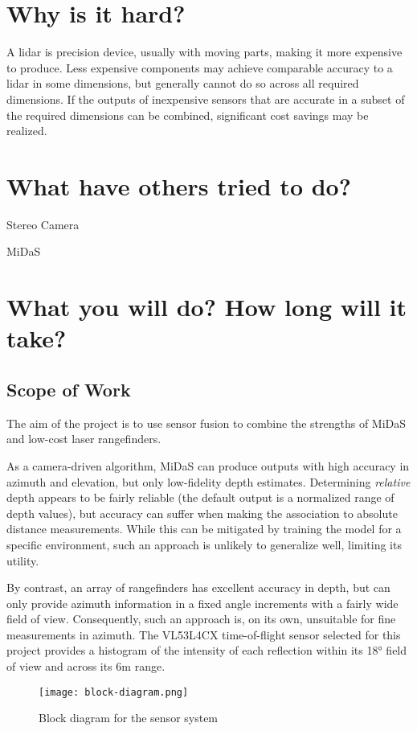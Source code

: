 \documentclass[conference]{IEEEtran}
\begin{document}
\section{Why is it hard?}
A lidar is precision device, usually with moving parts, making it more
expensive to produce. Less expensive components may achieve comparable accuracy
to a lidar in some dimensions, but generally cannot do so across all required
dimensions. If the outputs of inexpensive sensors that are accurate in a subset
of the required dimensions can be combined, significant cost savings may be
realized.

\section{What have others tried to do?}
Stereo Camera

MiDaS \cite{midas}


\section{What you will do? How long will it take?}
\subsection{Scope of Work}
The aim of the project is to use sensor fusion to combine the strengths of
MiDaS and low-cost laser rangefinders.

As a camera-driven algorithm, MiDaS can produce outputs with high accuracy in
azimuth and elevation, but only low-fidelity depth estimates. Determining
\textit{relative} depth appears to be fairly reliable (the default output is a
normalized range of depth values), but accuracy can suffer when making the
association to absolute distance measurements. While this can be mitigated by
training the model for a specific environment, such an approach is unlikely to
generalize well, limiting its utility.

By contrast, an array of rangefinders has excellent accuracy in depth, but can
only provide azimuth information in a fixed angle increments with a fairly wide
field of view. Consequently, such an approach is, on its own, unsuitable for
fine measurements in azimuth. The VL53L4CX time-of-flight sensor selected for
this project provides a histogram of the intensity of each reflection within
its 18° field of view and across its 6m range.

\begin{figure}
\centering
\texttt{[image: block-diagram.png]}
\caption{Block diagram for the sensor system}
\label{fig:block-diagram}
\end{figure}
\end{document}
